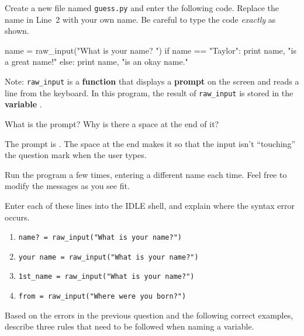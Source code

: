 
Create a new file named \texttt{guess.py} and enter the following code.
Replace the name in Line~2 with your own name.
Be careful to type the code \emph{exactly} as shown.

\begin{pythbox}
name = raw_input("What is your name? ")
if name == "Taylor":
    print name, "is a great name!"
else:
    print name, "is an okay name."
\end{pythbox}

Note: \verb|raw_input| is a \textbf{function} that displays a \textbf{prompt} on the screen and reads a line from the keyboard.
In this program, the result of \verb|raw_input| is stored in the \textbf{variable} .




\Q What is the prompt? Why is there a space at the end of it?

\begin{answer}[3em]
The prompt is .
The space at the end makes it so that the input isn't ``touching'' the question mark when the user types.
\end{answer}


\Q Run the program a few times, entering a different name each time. Feel free to modify the messages as you see fit.

\vspace{1em}


\Q Enter each of these lines into the IDLE shell, and explain where the syntax error occurs.

\begin{enumerate}[itemsep=1ex]
\item \verb|name? = raw_input("What is your name?")|

\item \verb|your name = raw_input("What is your name?")|

\item \verb|1st_name = raw_input("What is your name?")|

\item \verb|from = raw_input("Where were you born?")|
\end{enumerate}


\Q Based on the errors in the previous question and the following correct examples, describe three rules that need to be followed when naming a variable.

